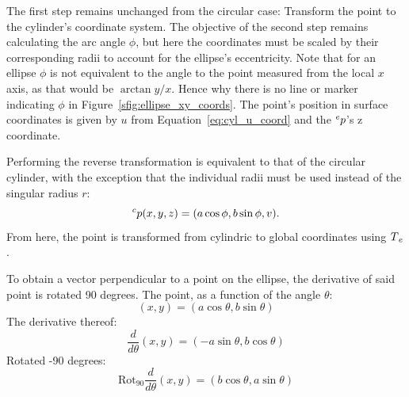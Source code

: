 The first step remains unchanged from the circular case: Transform the point to the cylinder's coordinate system.
The objective of the second step remains calculating the arc angle $\phi$, but here the coordinates must be scaled by their corresponding radii to account for the ellipse's eccentricity.
Note that for an ellipse $\phi$ is not equivalent to the angle to the point measured from the local $x$ axis, as that would be $\arctan y/x$.
Hence why there is no line or marker indicating $\phi$ in Figure~\ref{sfig:ellipse_xy_coords}.
The point's position in surface coordinates is given by $u$ from Equation~\ref{eq:cyl_u_coord} and the $\prescript{e}{}p$'s z coordinate.

Performing the reverse transformation is equivalent to that of the circular cylinder, with the exception that the individual radii must be used instead of the singular radius $r$:
\begin{equation*}
	\prescript{c}{}p(x,y,z) = (a \cos \phi, b \sin \phi, v).
\end{equation*}
From here, the point is transformed from cylindric to global coordinates using $\prescript{}{}T_e$.

\iffalse
To obtain a vector perpendicular to a point on the ellipse, the derivative of said point is rotated 90 degrees.
The point, as a function of the angle $\theta$:
\begin{equation}
	(x,y) = (a\cos\theta, b\sin\theta)
\end{equation}
The derivative thereof:
\begin{equation}
	\frac{d}{d\theta}(x,y) = (-a\sin\theta, b\cos\theta)
\end{equation}
Rotated -90 degrees:
\begin{equation}
	\text{Rot}_{90}\frac{d}{d\theta}(x,y) = (b\cos\theta, a\sin\theta)
\end{equation}


